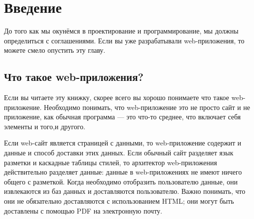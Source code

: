 \chapter{ Введение } \label{chapt1}

До того как мы окунёмся в проектирование и программирование, мы должны определиться с соглашениями. Если вы уже разрабатывали web-приложения, то можете смело опустить эту главу.

\section{ Что такое web-приложения?} \label{sect1_1}


Если вы читаете эту книжку, скорее всего вы хорошо понимаете что такое web-приложение. Необходимо понимать, что web-приложение это не просто сайт и не приложение, как обычная программа --- это что-то среднее, что включает себя элементы и того,и другого.

Если web-сайт является страницей с данными, то web-приложение содержит и данные и способ доставки этих данных. Если обычный сайт разделяет язык разметки и каскадные таблицы стилей, то архитектор web-приложения действительно разделяет данные: данные в web-приложениях не имеют ничего общего с разметкой. Когда необходимо отобразить пользователю данные, они извлекаются из баз данных и доставляются пользователю. Важно понимать, что они не обязательно доставляются с использованием HTML;  они могут быть доставлены с помощью PDF на электронную почту.










\clearpage